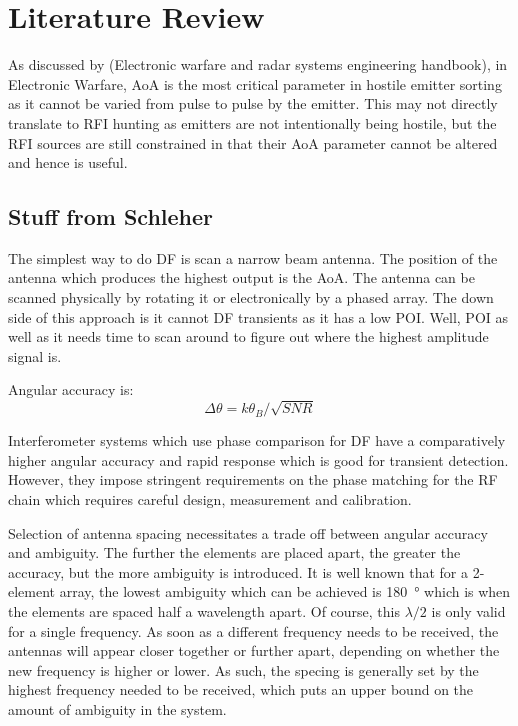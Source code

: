 \chapter{Literature Review}

As discussed by (Electronic warfare and radar systems engineering handbook), in Electronic Warfare, AoA is the most critical parameter in hostile emitter sorting as it cannot be varied from pulse to pulse by the emitter. This may not directly translate to RFI hunting as emitters are not intentionally being hostile, but the RFI sources are still constrained in that their AoA parameter cannot be altered and hence is useful. 

\section{Stuff from Schleher}
The simplest way to do DF is scan a narrow beam antenna. The position of the antenna which produces the highest output is the AoA. The antenna can be scanned physically by rotating it or electronically by a phased array. 
The down side of this approach is it cannot DF transients as it has a low POI. Well, POI as well as it needs time to scan around to figure out where the highest amplitude signal is.

Angular accuracy is:
\begin{equation}
  \Delta \theta = k \theta_B / \sqrt{SNR}
\end{equation}

Interferometer systems which use phase comparison for DF have a comparatively higher angular accuracy and rapid response which is good for transient detection. However, they impose stringent requirements on the phase matching for the RF chain which requires careful design, measurement and calibration. 

Selection of antenna spacing necessitates a trade off between angular accuracy and ambiguity. The further the elements are placed apart, the greater the accuracy, but the more ambiguity is introduced. It is well known that for a 2-element array, the lowest ambiguity which can be achieved is \SI{180}{\degree} which is when the elements are spaced half a wavelength apart. 
Of course, this \(\lambda/2\) is only valid for a single frequency. As soon as a different frequency needs to be received, the antennas will appear closer together or further apart, depending on whether the new frequency is higher or lower. As such, the specing is generally set by the highest frequency needed to be received, which puts an upper bound on the amount of ambiguity in the system. 


